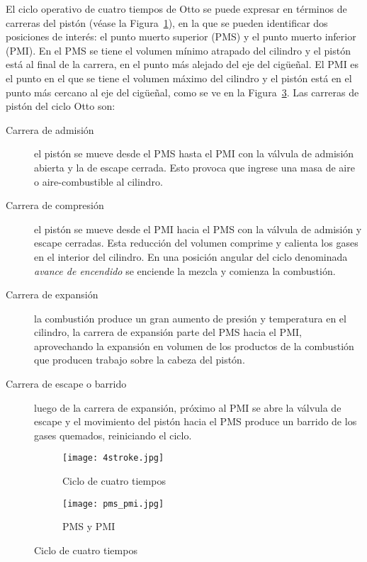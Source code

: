 El ciclo operativo de cuatro tiempos de Otto se puede expresar en términos de
carreras del pistón (véase la Figura~\ref{fig:4tiempos}), en la que se pueden
identificar dos posiciones de interés: el punto muerto superior (PMS) y el punto
muerto inferior (PMI).
%
En el PMS se tiene el volumen mínimo atrapado del cilindro y el pistón está al
final de la carrera, en el punto más alejado del eje del cigüeñal.
%
El PMI es el punto en el que se tiene el volumen máximo del cilindro y el pistón
está en el punto más cercano al eje del cigüeñal, como se ve en la
Figura~\ref{fig:pms_pmi}.
%
Las carreras de pistón del ciclo Otto son:
%
\begin{description}
%
    \item [Carrera de admisión] el pistón se mueve desde el PMS hasta el PMI con
        la válvula de admisión abierta y la de escape cerrada.
        Esto provoca que ingrese una masa de aire o aire-combustible al cilindro.
%
    \item [Carrera de compresión] el pistón se mueve desde el PMI hacia el PMS
        con la válvula de admisión y escape cerradas.
        Esta reducción del volumen comprime y calienta los gases en el interior
del cilindro.
        En una posición angular del ciclo denominada \emph{avance de encendido}
se enciende la mezcla y comienza la combustión.
%
    \item [Carrera de expansión] la combustión produce un gran
aumento de presión y temperatura en el cilindro, la carrera de expansión parte
del PMS hacia el PMI, aprovechando la expansión en volumen de los productos de
la combustión que producen trabajo sobre la cabeza del pistón.
%
    \item [Carrera de escape o barrido] luego de la carrera de expansión,
próximo al PMI se abre la válvula de escape y el movimiento del pistón hacia el
PMS produce un barrido de los gases quemados, reiniciando el ciclo.
%
\end{description}

\begin{figure}
  \centering
  \begin{subfigure}{0.6\textwidth}
    \centering
    \texttt{[image: 4stroke.jpg]}
    \caption{Ciclo de cuatro tiempos}\label{fig:4tiempos} %
  \end{subfigure}%
  \begin{subfigure}{0.4\textwidth}
    \centering
    \texttt{[image: pms\_pmi.jpg]}
    \caption{PMS y PMI}\label{fig:pms_pmi}
  \end{subfigure}
  \caption{Ciclo de cuatro tiempos}
\end{figure}

